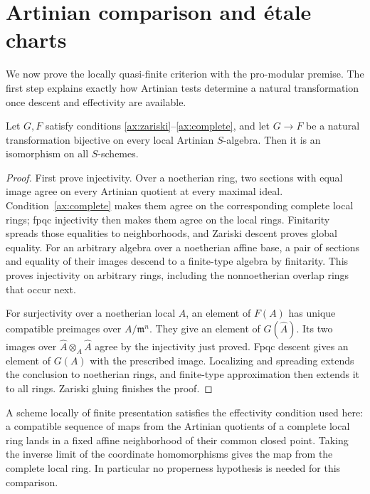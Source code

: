 \section{Artinian comparison and \'etale charts}\label{sec:comparison}

We now prove the locally quasi-finite criterion with the pro-modular premise. The first step explains exactly how Artinian tests determine a natural transformation once descent and effectivity are available.

\begin{lemma}\label{lem:comparison}
Let $G,F$ satisfy conditions \ref{ax:zariski}--\ref{ax:complete}, and let $G\to F$ be a natural transformation bijective on every local Artinian $S$-algebra. Then it is an isomorphism on all $S$-schemes.
\end{lemma}
\begin{proof}
First prove injectivity. Over a noetherian ring, two sections with equal image agree on every Artinian quotient at every maximal ideal. Condition~\ref{ax:complete} makes them agree on the corresponding complete local rings; fpqc injectivity then makes them agree on the local rings. Finitarity spreads those equalities to neighborhoods, and Zariski descent proves global equality. For an arbitrary algebra over a noetherian affine base, a pair of sections and equality of their images descend to a finite-type algebra by finitarity. This proves injectivity on arbitrary rings, including the nonnoetherian overlap rings that occur next.

For surjectivity over a noetherian local $A$, an element of $F(A)$ has unique compatible preimages over $A/\mathfrak m^n$. They give an element of $G(\widehat A)$. Its two images over $\widehat A\otimes_A\widehat A$ agree by the injectivity just proved. Fpqc descent gives an element of $G(A)$ with the prescribed image. Localizing and spreading extends the conclusion to noetherian rings, and finite-type approximation then extends it to all rings. Zariski gluing finishes the proof.
\end{proof}

A scheme locally of finite presentation satisfies the effectivity condition used here: a compatible sequence of maps from the Artinian quotients of a complete local ring lands in a fixed affine neighborhood of their common closed point. Taking the inverse limit of the coordinate homomorphisms gives the map from the complete local ring. In particular no properness hypothesis is needed for this comparison.

